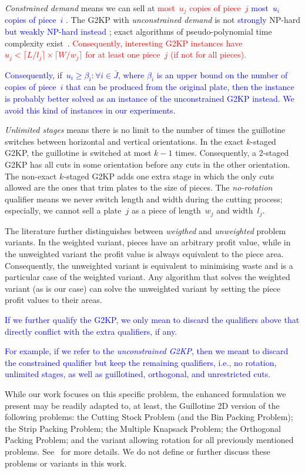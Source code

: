 \documentclass[smallextended]{svjour3}       %
\newif\iffinalversion
\newcommand{\newtext}[1]{\iffinalversion%
#1%
\else%
\textcolor{blue}{#1}%
\fi%
}
\newcommand{\oldtext}[1]{\iffinalversion%
#1%
\else%
\textcolor{red}{#1}%
\fi%
}
\begin{document}
\emph{Constrained demand} means we can sell at \oldtext{most~\(u_j\) copies of piece~\(j\)}\newtext{most~\(u_i\) copies of piece~\(i\)}.
The G2KP with \emph{unconstrained demand} is not \newtext{strongly} NP-hard \newtext{but weakly NP-hard instead}; exact algorithms of pseudo-polynomial time complexity exist~\cite{beasley:1985}.
\oldtext{Consequently, interesting G2KP instances have~\(u_j < \lceil L / l_j \rceil \times \lceil W / w_j \rceil \) for at least one piece~\(j\) (if not for all pieces).}
\newtext{Consequently, if~\(u_i \geq \beta_i : \forall i \in \bar{J}\), where \(\beta_i\) is an upper bound on the number of copies of piece~\(i\) that can be produced from the original plate, then the instance is probably better solved as an instance of the unconstrained G2KP instead. We avoid this kind of instances in our experiments.}
\emph{Unlimited stages} means there is no limit to the number of times the guillotine switches between horizontal and vertical orientations.
In the exact \(k\)-staged G2KP, the guillotine is switched at most \(k-1\) times.
Consequently, a 2-staged G2KP has all cuts in some orientation before any cuts in the other orientation.
The non-exact \(k\)-staged G2KP adds one extra stage in which the only cuts allowed are the ones that trim plates to the size of pieces.
The \emph{no-rotation} qualifier means we never switch length and width during the cutting process; especially, we cannot sell a plate~\(j\) as a piece of length~\(w_j\) and width~\(l_j\).

The literature further distinguishes between \emph{weigthed} and \emph{unweighted} problem variants.
In the weighted variant, pieces have an arbitrary profit value, while in the unweighted variant the profit value is always equivalent to the piece area.
Consequently, the unweighted variant is equivalent to minimising waste and is a particular case of the weighted variant.
Any algorithm that solves the weighted variant (as is our case) can solve the unweighted variant by setting the piece profit values to their areas.

\newtext{If we further qualify the G2KP, we only mean to discard the qualifiers above that directly conflict with the extra qualifiers, if any.}
\newtext{For example, if we refer to the \emph{unconstrained G2KP}, then we meant to discard the constrained qualifier but keep the remaining qualifiers, i.e., no rotation, unlimited stages, as well as guillotined, orthogonal, and unrestricted cuts.}

While our work focuses on this specific problem, the enhanced formulation we present may be readily adapted to, at least, the Guillotine 2D version of the following problems: the Cutting Stock Problem (and the Bin Packing Problem); the Strip Packing Problem; the Multiple Knapsack Problem; the Orthogonal Packing Problem; and the variant allowing rotation for all previously mentioned problems.
See~\cite{furini:2016} for more details.
We do not define or further discuss these problems or variants in this work.
\end{document}
